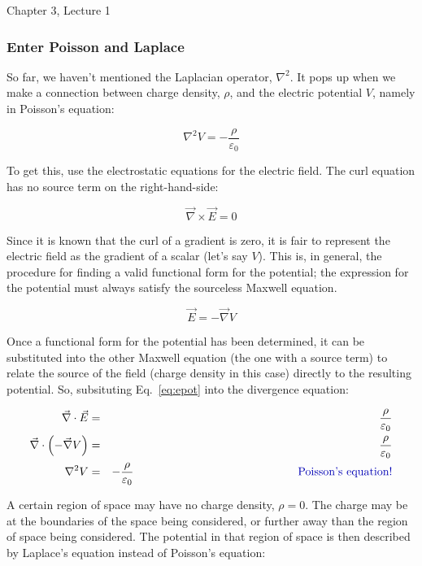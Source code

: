 \documentclass[12pt]{article}
\begin{document}
\begin{flushright} {\color{blue} Chapter 3, Lecture 1} \end{flushright}
\begin{flushleft}

\subsubsection*{\bf Enter Poisson and Laplace}

So far, we haven't mentioned the Laplacian operator, $\nabla^{2}$.  It pops up when we make a connection between charge density, $\rho$, and the electric potential $V$, namely in Poisson's equation:

\[
\nabla^{2}V=-\frac{\rho}{\varepsilon_{0}}
\]

To get this, use the electrostatic equations for the electric field.  The curl equation has no source term on the right-hand-side:

\[
\vec{\nabla} \times \vec{E} = 0
\]

Since it is known that the curl of a gradient is zero, it is fair to represent the electric field as the gradient of a scalar (let's say $V$).  This is, in general, the procedure for finding a valid functional form for the potential; the expression for the potential must always satisfy the sourceless Maxwell equation.

\begin{equation}
\vec{E} = -\vec{\nabla} V
\label{eq:epot}
\end{equation}

Once a functional form for the potential has been determined, it can be substituted into the other Maxwell equation (the one with a source term) to relate the source of the field (charge density in this case) directly to the resulting potential.  So, subsituting Eq.~\ref{eq:epot} into the divergence equation:

\begin{eqnarray*}
 \vec{\nabla} \cdot \vec{E} & = & \frac{\rho}{\varepsilon_{0}} \\
 \vec{\nabla} \cdot \left(-\vec{\nabla} V\right) & = & \frac{\rho}{\varepsilon_{0}} \\
 \nabla^{2} V  & = & -\frac{\rho}{\varepsilon_{0}} \hspace{2.in} \mbox{\color{myblue} Poisson's equation!} 
\end{eqnarray*}

A certain region of space may have no charge density, $\rho=0$.  The charge may be at the boundaries of the space being considered, or further away than the region of space being considered.  The potential in that region of space is then described by Laplace's equation instead of Poisson's equation:


\end{flushleft}
\end{document}
